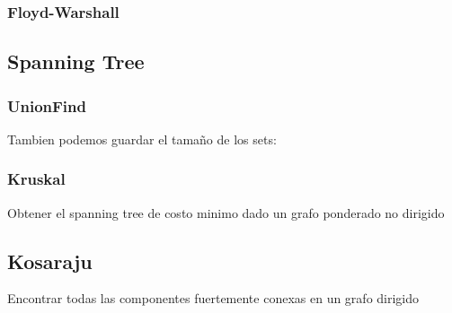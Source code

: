 \subsubsection{Floyd-Warshall}


\newpage
\subsection{Spanning Tree}
\subsubsection{UnionFind}


Tambien podemos guardar el tamaño de los sets: 

\subsubsection{Kruskal}
Obtener el spanning tree de costo minimo dado un grafo ponderado no dirigido




\subsection{Kosaraju}
Encontrar todas las componentes fuertemente conexas en un grafo dirigido


\newpage
